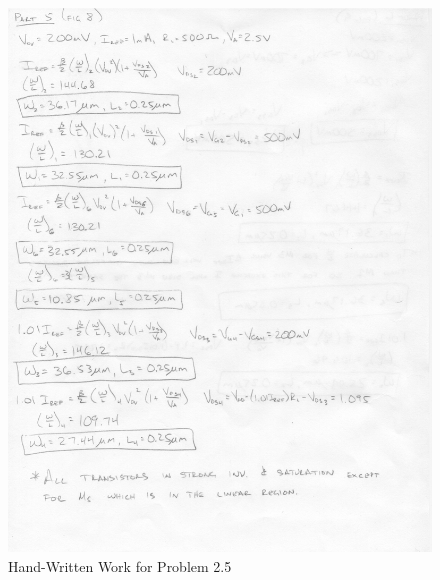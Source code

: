\documentclass{article}
\begin{document}
\subsection{}
\begin{figure}[H]
\centering
\includegraphics[width=6in]{1_7}
\caption{Hand-Written Work for Problem 2.5}
\label{2_5}
\end{figure}
\end{document}

